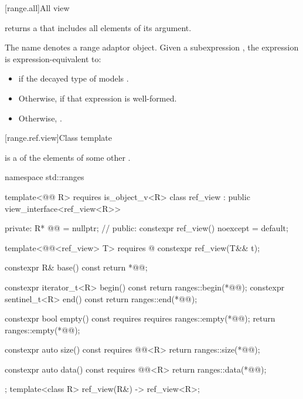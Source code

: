 [range.all]{All view}

\pnum
{}%
 returns a  that includes all elements of
its  argument.

\pnum
The name  denotes a
range adaptor object.
Given a subexpression , the expression
 is expression-equivalent to:
\begin{itemize}
\item {} if the decayed type of 
models .

\item Otherwise,  if that expression is well-formed.

\item Otherwise, .
\end{itemize}

[range.ref.view]{Class template }

\pnum
{} is a  of the elements of some other .
%
\begin{codeblock}
namespace std::ranges {
  template<@@ R>
    requires is_object_v<R>
  class ref_view : public view_interface<ref_view<R>> {
  private:
    R* @@ = nullptr;            // \expos
  public:
    constexpr ref_view() noexcept = default;

    template<@@<ref_view> T>
      requires @\seebelow@
    constexpr ref_view(T&& t);

    constexpr R& base() const { return *@@; }

    constexpr iterator_t<R> begin() const { return ranges::begin(*@@); }
    constexpr sentinel_t<R> end() const { return ranges::end(*@@); }

    constexpr bool empty() const
      requires requires { ranges::empty(*@@); }
    { return ranges::empty(*@@); }

    constexpr auto size() const requires @@<R>
    { return ranges::size(*@@); }

    constexpr auto data() const requires @@<R>
    { return ranges::data(*@@); }
  };
  template<class R>
    ref_view(R&) -> ref_view<R>;
}
\end{codeblock}

